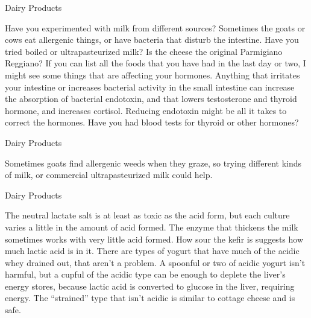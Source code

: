 \documentclass[11pt,oneside,openany,extrafontsizes]{memoir}
\begin{document}
\begin{standalonequote}{Dairy Products}

    \begin{answer}
        Have you experimented with milk from different sources? Sometimes the goats or cows eat allergenic things, or have bacteria that disturb the intestine. Have you tried boiled or ultrapasteurized milk? Is the cheese the original Parmigiano Reggiano? If you can list all the foods that you have had in the last day or two, I might see some things that are affecting your hormones. Anything that irritates your intestine or increases bacterial activity in the small intestine can increase the absorption of bacterial endotoxin, and that lowers testosterone and thyroid hormone, and increases cortisol. Reducing endotoxin might be all it takes to correct the hormones. Have you had blood tests for thyroid or other hormones?
    \end{answer}
\end{standalonequote}

\begin{standalonequote}{Dairy Products}

    \begin{answer}
        Sometimes goats find allergenic weeds when they graze, so trying different kinds of milk, or commercial ultrapasteurized milk could help.
    \end{answer}
\end{standalonequote}

\begin{standalonequote}{Dairy Products}

    \begin{answer}
        The neutral lactate salt is at least as toxic as the acid form, but each culture varies a little in the amount of acid formed. The enzyme that thickens the milk sometimes works with very little acid formed. How sour the kefir is suggests how much lactic acid is in it. There are types of yogurt that have much of the acidic whey drained out, that aren't a problem. A spoonful or two of acidic yogurt isn't harmful, but a cupful of the acidic type can be enough to deplete the liver's energy stores, because lactic acid is converted to glucose in the liver, requiring energy. The \enquote{strained} type that isn't acidic is similar to cottage cheese and is safe.
    \end{answer}
\end{standalonequote}
\end{document}
